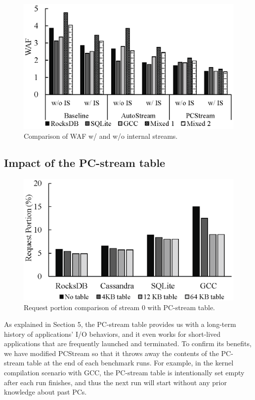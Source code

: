 \begin{figure}[t]
	\centering
	\includegraphics[width=0.9\linewidth]{figure/internal}
	\caption{Comparison of WAF w/ and w/o internal streams.}
	\label{fig:internal}
	\vspace{-20pt}
\end{figure}


\subsection{Impact of the PC-stream table}

\begin{figure}[t]
	\centering
	\includegraphics[width=0.7\linewidth]{figure/pctable}
	\caption{Request portion comparison of stream 0 with PC-stream table.}
	\label{fig:pctable}
	\vspace{-20pt}
\end{figure}

As explained in Section 5, the PC-stream table provides us with a long-term
history of applications' I/O behaviors, and it even works for short-lived
applications that are frequently launched and terminated. To confirm its
benefits, we have modified \textsf{PCStream} so that it throws away the
contents of the PC-stream table at the end of each benchmark runs. For example,
in the kernel compilation scenario with GCC, the PC-stream table is
intentionally set empty after each run finishes, and thus the next run will
start without any prior knowledge about past PCs.

